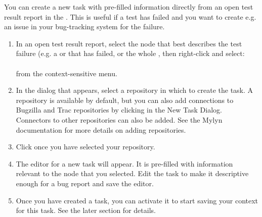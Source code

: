  You can create a new task with pre-filled information directly from an open test result report in the \gdtestresultview{}. This is useful if a test has failed and you want to create e.g. an issue in your bug-tracking system for the failure. 
\begin{enumerate}
\item In an open test result report, select the node that best describes the test failure (e.g. a \gdcase{} or \gdstep{} that has failed, or the whole \gdsuite{}, then right-click and select:\\
\\
from the context-sensitive menu.
\item  In the dialog that appears, select a repository in which to create the task. A  repository is available by default, but you can also add connections to Bugzilla and Trac repositories by clicking  in the New Task Dialog. Connectors to other repositories can also be added. See the Mylyn documentation for more details on adding repositories.
\item Click  once you have selected your repository. 
\item The editor for a new task will appear. It is pre-filled with information relevant to the node that you selected. Edit the task to make it descriptive enough for a bug report and save the editor. 
\item Once you have created a task, you can activate it to start saving your context for this task. See the later section  for details.
\end{enumerate}
